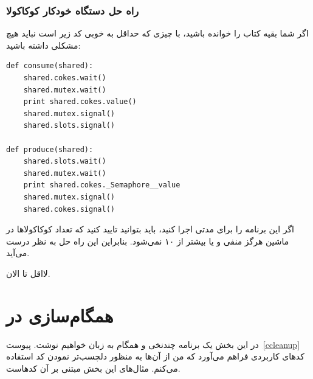 \documentclass{book}
\newcommand{\clearemptydoublepage}{\newpage\cleardoublepage}
\begin{document}
\clearemptydoublepage
\subsection {راه حل دستگاه خودکار کوکاکولا}

    اگر شما بقیه کتاب را خوانده باشید، با چیزی که حداقل به خوبی کد زیر است نباید هیچ مشکلی داشته باشید:

\begin{latin}
\begin{lstlisting}
def consume(shared):
    shared.cokes.wait()
    shared.mutex.wait()
    print shared.cokes.value()
    shared.mutex.signal()
    shared.slots.signal()

def produce(shared):
    shared.slots.wait()
    shared.mutex.wait()
    print shared.cokes._Semaphore__value
    shared.mutex.signal()
    shared.cokes.signal()
\end{lstlisting}
\end{latin}


    اگر این برنامه را برای مدتی اجرا کنید، باید بتوانید تایید کنید که تعداد کوکاکولاها در ماشین هرگز منفی و یا بیشتر از ۱۰ نمی‌شود. 
    بنابراین این راه حل به نظر درست می‌آید. 

    لااقل تا الان. 

\chapter{همگام‌سازی در }
\label{csync}

    در این بخش یک برنامه چندنخی و همگام به زبان  خواهیم نوشت. پیوست~\ref{ccleanup} کدهای کاربردی فراهم می‌آورد که 
    من از آن‌ها به منظور دلچسب‌تر نمودن کد   استفاده می‌کنم. مثال‌های این بخش مبتنی بر آن کدهاست. 
    
\end{document}
